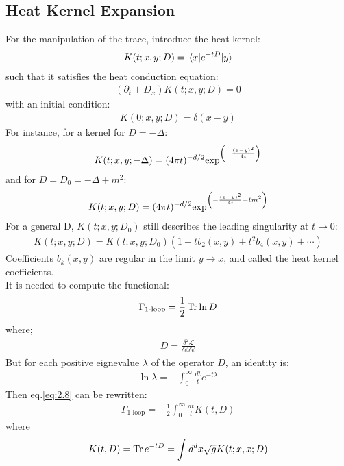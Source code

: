 \subsection{Heat Kernel Expansion}
For the manipulation of the trace, introduce the heat kernel:
\begin{align}
    K(t;x,y;D) = \mel{x}{e^{-tD}}{y}
\end{align}
such that it satisfies the heat conduction equation:
\begin{align}
    (\partial _{t} + D_{x})K(t;x,y;D) = 0
\end{align}
with an initial condition:
\begin{align}
    K(0;x,y;D) = \delta (x-y)
\end{align}
For instance, for a kernel for $ D = - \Delta$:
\begin{align}
    K(t;x,y;-\Delta) = (4\pi t)^{-d/2} \text{exp} ^{\qty (-\frac{(x-y)^2}{4t})}
\end{align}
and for $D = D_{0}= -\Delta +m^2 $:
\begin{align}
    K(t;x,y;D) = (4\pi t)^{-d/2} \text{exp}^{ \qty (-\frac{(x-y)^2}{4t} - tm^2)}
\end{align}
For a general D, $K(t;x,y;D_{0})$ still describes the leading singularity at $t \to 0$:
\begin{align}
    K(t;x,y;D) = K(t;x,y;D_{0}) (1 + tb_{2} (x,y) + t^{2} b_{4}(x,y) + \cdots)
\end{align}
Coefficients $b_{k} (x,y)$ are regular in the limit $y \to x$, and called the heat kernel coefficients. \\
\indent It is needed to compute the functional:
\begin{align}
    \Gamma_{\text{1-loop}} = \frac{1}{2} \Tr \ln D
\end{align}
where;
\begin{align}
    D = \frac{\delta^2 \mathcal{L}}{\delta \phi \delta \phi} 
\end{align}
But for each positive eignevalue $\lambda$ of the operator $D$, an identity is:
\begin{align}
    \ln \lambda = -\int _{0} ^{\infty} \frac{dt}{t} e^{-t\lambda}
\end{align}
Then eq.\ref{eq:2.8} can be rewritten:
\begin{align}
    \Gamma _{\text{1-loop}} = -\frac{1}{2} \int _{0}^{\infty} \frac{dt}{t} K(t,D)
\end{align}
where 
\begin{align}
    K(t,D) = \Tr e^{-tD} = \int d^{d} x \sqrt{g} K(t;x,x;D)
\end{align}
